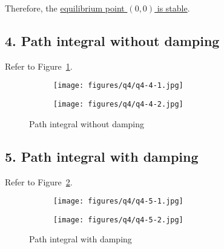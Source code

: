 Therefore, the \underline{equilibrium point \( (0, 0) \) is stable}.

\subsection*{4. Path integral without damping}

Refer to Figure~\ref{fig:q4-4}.

\begin{figure}[h]
    \centering
    \begin{subfigure}{\textwidth}
        \centering
        \texttt{[image: figures/q4/q4-4-1.jpg]}
    \end{subfigure}
    \vfill
    \begin{subfigure}{\textwidth}
        \centering
        \texttt{[image: figures/q4/q4-4-2.jpg]}
    \end{subfigure}
    \caption{
        Path integral without damping
    }\label{fig:q4-4}
\end{figure}

\subsection*{5. Path integral with damping}

Refer to Figure~\ref{fig:q4-5}.

\begin{figure}[h]
    \centering
    \begin{subfigure}{\textwidth}
        \centering
        \texttt{[image: figures/q4/q4-5-1.jpg]}
    \end{subfigure}
    \vfill
    \begin{subfigure}{\textwidth}
        \centering
        \texttt{[image: figures/q4/q4-5-2.jpg]}
    \end{subfigure}
    \caption{
        Path integral with damping
    }\label{fig:q4-5}
\end{figure}
